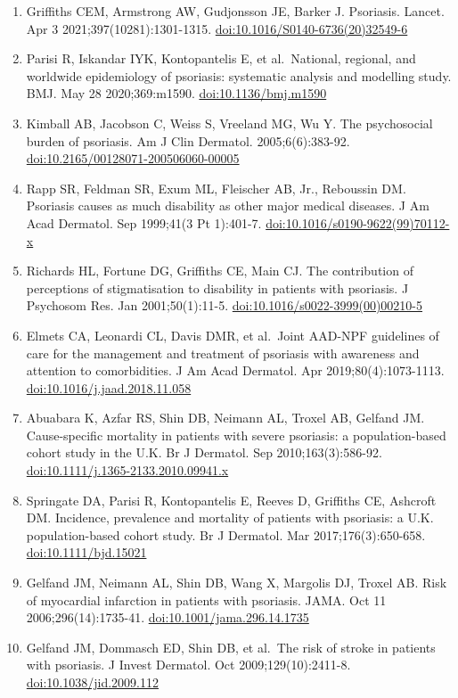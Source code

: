 \documentclass[
  12pt,
]{article}
\providecommand{\tightlist}{%
  \setlength{\itemsep}{0pt}\setlength{\parskip}{0pt}}
\begin{document}
\begin{enumerate}
\def\labelenumi{\arabic{enumi}.}
\tightlist
\item
  Griffiths CEM, Armstrong AW, Gudjonsson JE, Barker J. Psoriasis. Lancet. Apr 3 2021;397(10281):1301-1315. \url{doi:10.1016/S0140-6736(20)32549-6}
\item
  Parisi R, Iskandar IYK, Kontopantelis E, et al.~National, regional, and worldwide epidemiology of psoriasis: systematic analysis and modelling study. BMJ. May 28 2020;369:m1590. \url{doi:10.1136/bmj.m1590}
\item
  Kimball AB, Jacobson C, Weiss S, Vreeland MG, Wu Y. The psychosocial burden of psoriasis. Am J Clin Dermatol. 2005;6(6):383-92. \url{doi:10.2165/00128071-200506060-00005}
\item
  Rapp SR, Feldman SR, Exum ML, Fleischer AB, Jr., Reboussin DM. Psoriasis causes as much disability as other major medical diseases. J Am Acad Dermatol. Sep 1999;41(3 Pt 1):401-7. \url{doi:10.1016/s0190-9622(99)70112-x}
\item
  Richards HL, Fortune DG, Griffiths CE, Main CJ. The contribution of perceptions of stigmatisation to disability in patients with psoriasis. J Psychosom Res. Jan 2001;50(1):11-5. \url{doi:10.1016/s0022-3999(00)00210-5}
\item
  Elmets CA, Leonardi CL, Davis DMR, et al.~Joint AAD-NPF guidelines of care for the management and treatment of psoriasis with awareness and attention to comorbidities. J Am Acad Dermatol. Apr 2019;80(4):1073-1113. \url{doi:10.1016/j.jaad.2018.11.058}
\item
  Abuabara K, Azfar RS, Shin DB, Neimann AL, Troxel AB, Gelfand JM. Cause-specific mortality in patients with severe psoriasis: a population-based cohort study in the U.K. Br J Dermatol. Sep 2010;163(3):586-92. \url{doi:10.1111/j.1365-2133.2010.09941.x}
\item
  Springate DA, Parisi R, Kontopantelis E, Reeves D, Griffiths CE, Ashcroft DM. Incidence, prevalence and mortality of patients with psoriasis: a U.K. population-based cohort study. Br J Dermatol. Mar 2017;176(3):650-658. \url{doi:10.1111/bjd.15021}
\item
  Gelfand JM, Neimann AL, Shin DB, Wang X, Margolis DJ, Troxel AB. Risk of myocardial infarction in patients with psoriasis. JAMA. Oct 11 2006;296(14):1735-41. \url{doi:10.1001/jama.296.14.1735}
\item
  Gelfand JM, Dommasch ED, Shin DB, et al.~The risk of stroke in patients with psoriasis. J Invest Dermatol. Oct 2009;129(10):2411-8. \url{doi:10.1038/jid.2009.112}

\end{enumerate}
\end{document}
